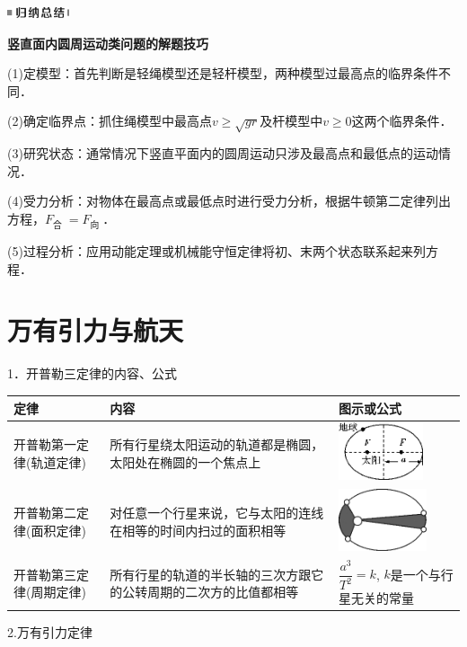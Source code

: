 \documentclass[cn,10.5pt,chinese,mac,chinesefont=founder]{elegantbook}
\begin{document}
\begin{center}\includegraphics[width=0.71667in,height=0.13333in]{media/image13.png}

\textbf{竖直面内圆周运动类问题的解题技巧}
\end{center}


(1)定模型：首先判断是轻绳模型还是轻杆模型，两种模型过最高点的临界条件不同．

(2)确定临界点：抓住绳模型中最高点$v \geq \sqrt{g r}$及杆模型中$v \geq 0$这两个临界条件．

(3)研究状态：通常情况下竖直平面内的圆周运动只涉及最高点和最低点的运动情况．

(4)受力分析：对物体在最高点或最低点时进行受力分析，根据牛顿第二定律列出方程，$F_{\text {合 }}=F_{\text {向 }}$．

(5)过程分析：应用动能定理或机械能守恒定律将初、末两个状态联系起来列方程．

\newpage
\section{万有引力与航天}


1．开普勒三定律的内容、公式

\begin{longtable}[]{@{}m{3cm}m{6.5cm}m{3.5cm}@{}}
\toprule
定律 & 内容 & 图示或公式\tabularnewline
\midrule
\endhead
开普勒第一定律(轨道定律) &所有行星绕太阳运动的轨道都是椭圆，太阳处在椭圆的一个焦点上&
\includegraphics[width=0.98333in,height=0.66667in]{media/image198.png}\tabularnewline
开普勒第二定律(面积定律) &对任意一个行星来说，它与太阳的连线在相等的时间内扫过的面积相等 &
\includegraphics[width=1.01667in,height=0.71667in]{media/image199.png}\tabularnewline
开普勒第三定律(周期定律)&所有行星的轨道的半长轴的三次方跟它的公转周期的二次方的比值都相等& 
$\dfrac{a^{3}}{T^{2}}=k$, $k$是一个与行星无关的常量\tabularnewline
\bottomrule
\end{longtable}

2.万有引力定律
\end{document}
